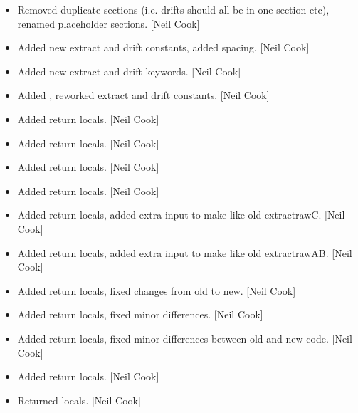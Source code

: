\documentclass[a4paper,10pt,english]{report}
\begin{document}
\begin{itemize}
\item {} 
Removed duplicate sections (i.e. drifts should all be in one section
etc), renamed placeholder sections. {[}Neil Cook{]}

\item {} 
Added new extract and drift constants, added spacing. {[}Neil Cook{]}

\item {} 
Added new extract and drift keywords. {[}Neil Cook{]}

\item {} 
Added , reworked extract and drift constants. {[}Neil Cook{]}

\item {} 
Added return locals. {[}Neil Cook{]}

\item {} 
Added return locals. {[}Neil Cook{]}

\item {} 
Added return locals. {[}Neil Cook{]}

\item {} 
Added return locals. {[}Neil Cook{]}

\item {} 
Added return locals, added extra input to make like old extractrawC.
{[}Neil Cook{]}

\item {} 
Added return locals, added extra input to make like old extractrawAB.
{[}Neil Cook{]}

\item {} 
Added return locals, fixed changes from old to new. {[}Neil Cook{]}

\item {} 
Added return locals, fixed minor differences. {[}Neil Cook{]}

\item {} 
Added return locals, fixed minor differences between old and new code.
{[}Neil Cook{]}

\item {} 
Added return locals. {[}Neil Cook{]}

\item {} 
Returned locals. {[}Neil Cook{]}

\end{itemize}
\end{document}
